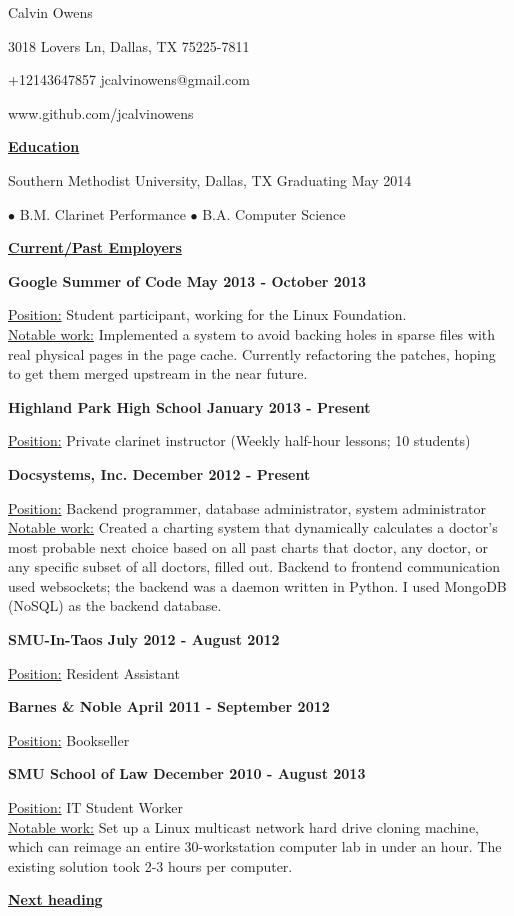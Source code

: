 \documentclass[12pt]{article}
\begin{document}
\centerline{{\Huge \sc Calvin Owens}}
\centerline{3018 Lovers Ln, Dallas, TX 75225-7811}
\centerline{+12143647857 \textbullet \hspace{1pt} jcalvinowens@gmail.com}
\centerline{www.github.com/jcalvinowens}

\noindent
\hrulefill

\centerline{\underline{\bf Education}}
\bigskip
\centerline{Southern Methodist University, Dallas, TX \hfill Graduating May 2014}
\centerline{\hfill $\bullet$ B.M. Clarinet Performance \hfill $\bullet$ B.A. Computer Science \hfill}

\noindent
\hrulefill

\centerline{\underline{\bf Current/Past Employers}}
\bigskip
\noindent\centerline{\bf Google Summer of Code \hfill May 2013 - October 2013}
\underline{Position:} Student participant, working for the Linux Foundation. \\
\underline{Notable work:} Implemented a system to avoid backing holes in sparse
files with real physical pages in the page cache. Currently refactoring the
patches, hoping to get them merged upstream in the near future.
\vspace*{6pt}\\
\noindent\centerline{\bf Highland Park High School \hfill January 2013 - Present}
\underline{Position:} Private clarinet instructor (Weekly half-hour lessons; 10 students)
\vspace*{6pt}\\
\noindent\centerline{\bf Docsystems, Inc. \hfill December 2012 - Present}
\underline{Position:} Backend programmer, database administrator, system administrator \\
\underline{Notable work:} Created a charting system that dynamically calculates
a doctor's most probable next choice based on all past charts that doctor, any
doctor, or any specific subset of all doctors, filled out. Backend to frontend
communication used websockets; the backend was a daemon written in Python. I
used MongoDB (NoSQL) as the backend database.
\vspace*{6pt}\\
\noindent\centerline{\bf SMU-In-Taos \hfill July 2012 - August 2012}
\underline{Position:} Resident Assistant
\vspace*{6pt}\\
\noindent\centerline{\bf Barnes \& Noble \hfill April 2011 - September 2012}
\underline{Position:} Bookseller
\vspace*{6pt}\\
\noindent\centerline{\bf SMU School of Law \hfill December 2010 - August 2013}
\underline{Position:} IT Student Worker\\
\underline{Notable work:} Set up a Linux multicast network hard drive cloning
machine, which can reimage an entire 30-workstation computer lab in under an
hour. The existing solution took 2-3 hours per computer.

\noindent
\hrulefill

\centerline{\underline{\bf Next heading}}
\end{document}
